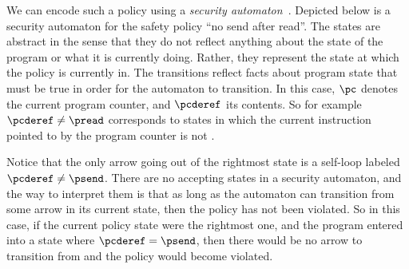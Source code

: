 \documentclass[11pt,twoside]{scrartcl}
\begin{document}
We can encode such a policy using a \emph{security automaton}~\cite{Schneider2000}. Depicted below is a security automaton for the safety policy ``no send after read''. The states are abstract in the sense that they do not reflect anything about the state of the program or what it is currently doing. Rather, they represent the state at which the policy is currently in. The transitions reflect facts about program state that must be true in order for the automaton to transition. In this case, $\pc$ denotes the current program counter, and $\pcderef$ its contents. So for example $\pcderef \ne \pread$ corresponds to states in which the current instruction pointed to by the program counter is not \pread.
\begin{center}
\end{center}
Notice that the only arrow going out of the rightmost state is a self-loop labeled $\pcderef \ne \psend$. There are no accepting states in a security automaton, and the way to interpret them is that as long as the automaton can transition from some arrow in its current state, then the policy has not been violated. So in this case, if the current policy state were the rightmost one, and the program entered into a state where $\pcderef = \psend$, then there would be no arrow to transition from and the policy would become violated.
\end{document}
